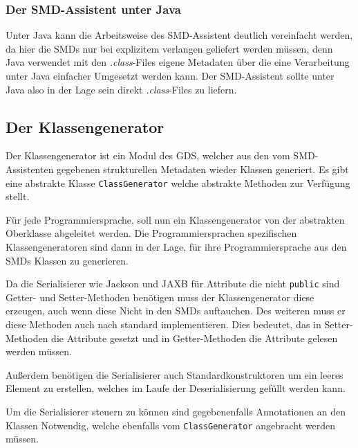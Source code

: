 \subsubsection{Der SMD-Assistent unter Java}
Unter Java kann die Arbeitsweise des SMD-Assistent deutlich vereinfacht werden, da hier die \ac{SMD}s nur bei explizitem verlangen geliefert werden m\"ussen, denn Java verwendet mit den \textit{.class}-Files eigene Metadaten \"uber die eine Verarbeitung unter Java einfacher Umgesetzt werden kann. 
Der SMD-Assistent sollte unter Java also in der Lage sein direkt \textit{.class}-Files zu liefern.

\subsection{Der Klassengenerator} \label{CG}
Der Klassengenerator ist ein Modul des \ac{GDS}, welcher aus den vom SMD-Assistenten gegebenen strukturellen Metadaten wieder Klassen generiert. Es gibt eine abstrakte Klasse \texttt{ClassGenerator} welche abstrakte Methoden zur Verf\"ugung stellt. 

F\"ur jede Programmiersprache, soll nun ein Klassengenerator von der abstrakten Oberklasse abgeleitet werden. Die Programmiersprachen spezifischen Klassengeneratoren sind dann in der Lage, f\"ur ihre Programmiersprache aus den \ac{SMD}s Klassen zu generieren.

Da die Serialisierer wie Jackson und JAXB f\"ur Attribute die nicht \texttt{public} sind Getter- und Setter-Methoden ben\"otigen muss der Klassengenerator diese erzeugen, auch wenn diese Nicht in den \ac{SMD}s auftauchen. Des weiteren muss er diese Methoden auch nach standard implementieren. Dies bedeutet, das in Setter-Methoden die Attribute gesetzt und in Getter-Methoden die Attribute  gelesen werden m\"ussen.

Au\ss{}erdem ben\"otigen die Serialisierer auch Standardkonstruktoren um ein leeres Element zu erstellen, welches im Laufe der Deserialisierung gef\"ullt werden kann.

Um die Serialisierer steuern zu k\"onnen sind gegebenenfalls Annotationen an den Klassen Notwendig, welche ebenfalls vom \texttt{ClassGenerator} angebracht werden m\"ussen.



